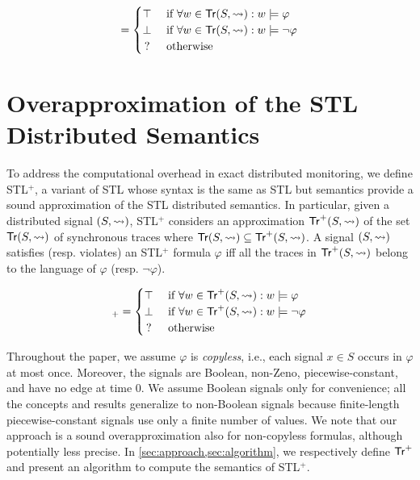 \footnotesize
\begin{equation*}
	[(S,{\hb}) \models \varphi] = 
	\begin{cases}
		\top & \text{ if } \forall w \in \tr(S,{\hb}) : w \models \varphi \\
		\bot & \text{ if } \forall w \in \tr(S,{\hb}) : w \models \lnot\varphi \\
		\,? & \text{ otherwise}
	\end{cases}
\end{equation*}
\normalsize



\section{Overapproximation of the STL Distributed Semantics}
\label{sec:semantics}

To address the computational overhead in exact distributed monitoring, we define STL$^+$, a variant of STL whose syntax is the same as STL but semantics provide a sound approximation of the STL distributed semantics.
In particular, given a distributed signal $(S,{\rightsquigarrow})$, STL$^+$ considers an approximation 
$\mathsf{Tr}^+(S,{\rightsquigarrow})$ of the set $\mathsf{Tr}(S,{\rightsquigarrow})$ of synchronous traces where $ \mathsf{Tr}(S,{\rightsquigarrow}) \subseteq \mathsf{Tr}^+(S,{\rightsquigarrow})$.
A signal $(S,{\rightsquigarrow})$ satisfies (resp. violates) an STL$^+$ formula $\varphi$ iff all the traces in $\mathsf{Tr}^+(S,{\rightsquigarrow})$ belong to the language of $\varphi$ (resp. $\lnot \varphi$).

\footnotesize
\begin{equation*}
	[(S,{\hb}) \models \varphi]_+ = 
	\begin{cases}
		\top & \text{ if } \forall w \in \tr^+(S,{\hb}) : w \models \varphi \\
		\bot & \text{ if } \forall w \in \tr^+(S,{\hb}) : w \models \lnot\varphi \\
		\,? & \text{ otherwise}
	\end{cases}
\end{equation*}
\normalsize

Throughout the paper, we assume  $\varphi$ is \emph{copyless}, i.e., each signal $x \in S$ occurs in $\varphi$ at most once.
Moreover, the signals are Boolean, non-Zeno, piecewise-constant, and have no edge at time 0.
We assume Boolean signals only for convenience; all the concepts and results generalize to non-Boolean signals because finite-length piecewise-constant signals use only a finite number of values.
We note that our approach is a sound overapproximation also for non-copyless formulas, although potentially less precise.
In \cref{sec:approach,sec:algorithm}, we respectively define $\mathsf{Tr}^+$ and present an algorithm to compute the semantics of STL$^+$.

